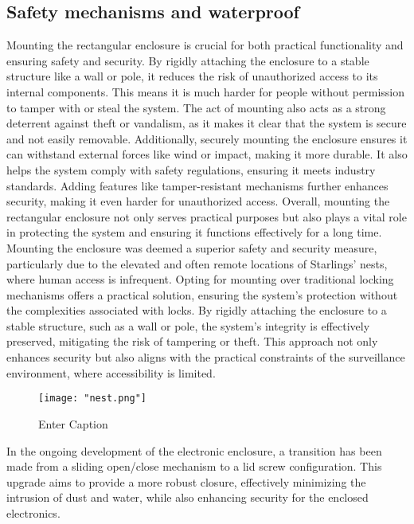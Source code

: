 \documentclass[class=report,11pt,crop=false]{standalone}
\begin{document}
\subsection{Safety mechanisms and waterproof}
Mounting the rectangular enclosure is crucial for both practical functionality and ensuring safety and security. By rigidly attaching the enclosure to a stable structure like a wall or pole, it reduces the risk of unauthorized access to its internal components. This means it is much harder for people without permission to tamper with or steal the system. The act of mounting also acts as a strong deterrent against theft or vandalism, as it makes it clear that the system is secure and not easily removable. Additionally, securely mounting the enclosure ensures it can withstand external forces like wind or impact, making it more durable. It also helps the system comply with safety regulations, ensuring it meets industry standards. Adding features like tamper-resistant mechanisms further enhances security, making it even harder for unauthorized access. Overall, mounting the rectangular enclosure not only serves practical purposes but also plays a vital role in protecting the system and ensuring it functions effectively for a long time.
Mounting the enclosure was deemed a superior safety and security measure, particularly due to the elevated and often remote locations of Starlings' nests, where human access is infrequent. Opting for mounting over traditional locking mechanisms offers a practical solution, ensuring the system's protection without the complexities associated with locks. By rigidly attaching the enclosure to a stable structure, such as a wall or pole, the system's integrity is effectively preserved, mitigating the risk of tampering or theft. This approach not only enhances security but also aligns with the practical constraints of the surveillance environment, where accessibility is limited.


\begin{figure}[H]
    \centering
    \texttt{[image: "nest.png"]}
    \caption{Enter Caption}
    \label{fig:enter-label2}
\end{figure}

 
In the ongoing development of the electronic enclosure, a transition has been made from a sliding open/close mechanism to a lid screw configuration. This upgrade aims to provide a more robust closure, effectively minimizing the intrusion of dust and water, while also enhancing security for the enclosed electronics.
\newline
\end{document}
